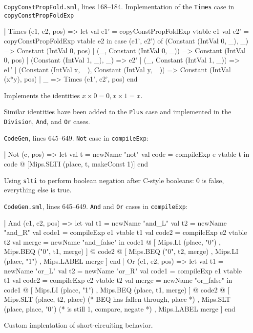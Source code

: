 \documentclass[12pt, a4paper]{article}
\begin{document}
\texttt{CopyConstPropFold.sml}, lines 168--184. Implementation of the
\texttt{Times} case in \texttt{copyConstPropFoldExp}
\begin{lstlistings}
      | Times (e1, e2, pos) =>
        let val e1' = copyConstPropFoldExp vtable e1
            val e2' = copyConstPropFoldExp vtable e2
        in case (e1', e2') of
               (Constant (IntVal 0, _), _) =>
               Constant (IntVal 0, pos)
             | (_, Constant (IntVal 0, _)) =>
               Constant (IntVal 0, pos)
             | (Constant (IntVal 1, _), _) =>
               e2'
             | (_, Constant (IntVal 1, _)) =>
               e1'
             | (Constant (IntVal x, _), Constant (IntVal y, _)) =>
               Constant (IntVal (x*y), pos)
             | _ =>
               Times (e1', e2', pos)
        end
\end{lstlistings}
Implements the identities $x\times0=0, x\times1=x$.

Similar identities have been added to the \texttt{Plus} case and
implemented in the \texttt{Division}, \texttt{And}, and \texttt{Or}
cases.

\texttt{CodeGen}, lines 645--649. \texttt{Not} case in \texttt{compileExp}:
\begin{lstlistings}
  | Not (e, pos) =>
      let val t = newName "not"
          val code = compileExp e vtable t
      in code @ [Mips.SLTI (place, t, makeConst 1)]
      end
\end{lstlistings}
Using \texttt{slti} to perform boolean negation after C-style booleans: 0 is false, everything
else is true.


\texttt{CodeGen.sml}, lines 645--649. \texttt{And} and \texttt{Or} cases in \texttt{compileExp}:
\begin{lstlistings}
  | And (e1, e2, pos) =>
      let val t1 = newName "and_L"
          val t2 = newName "and_R"
          val code1 = compileExp e1 vtable t1
          val code2 = compileExp e2 vtable t2
          val merge = newName "and_false"
      in code1 @
          [ Mips.LI (place, "0")
          , Mips.BEQ ("0", t1, merge) ]
          @ code2 @
          [ Mips.BEQ ("0", t2, merge)
          , Mips.LI (place, "1")
          , Mips.LABEL merge ]
      end
  | Or (e1, e2, pos) =>
      let val t1 = newName "or_L"
          val t2 = newName "or_R"
          val code1 = compileExp e1 vtable t1
          val code2 = compileExp e2 vtable t2
          val merge = newName "or_false"
      in code1 @
          [ Mips.LI (place, "1")
          , Mips.BEQ (place, t1, merge) ]
          @ code2 @
          [ Mips.SLT (place, t2, place)  (* BEQ has fallen through, place *)
          , Mips.SLT (place, place, "0") (* is still 1, compare, negate *)
          , Mips.LABEL merge ]
      end
\end{lstlistings}
Custom implentation of short-circuiting behavior.
\end{document}
